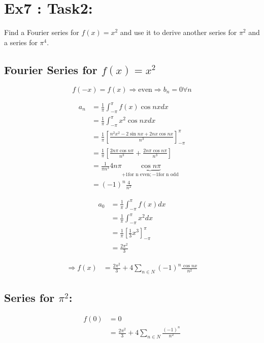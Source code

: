 \documentclass{article}
\begin{document}
\section{Ex7 : Task2:}
Find a Fourier series for $f (x) = x^2$ and use it to derive another series for $\pi^2$ and a series
for $\pi^4$.

\subsection{Fourier Series for $f(x) = x^2$}

\[
f(-x) = f(x) \Rightarrow \text{even} \Rightarrow b_n=0\forall n
\]

\begin{align}
a_n &= \frac{1}{\pi} \int_{-\pi}^\pi {f(x) \cos{nx} dx} \\
  &= \frac{1}{\pi} \int_{-\pi}^\pi {x^2 \cos{nx} dx} \\
	&= \frac{1}{\pi} \left[ \frac{n^2x^2-2\sin{nx} + 2nx\cos{nx}}{n^3} \right]_{-\pi}^\pi \\
	&= \frac{1}{\pi} \left[ \frac{2n\pi\cos{n\pi}}{n^3} + \frac{2n\pi\cos{n\pi}}{n^3} \right] \\
	&= \frac{1}{\pi n^3}4n\pi\underbrace{\cos{n\pi}}_{+1 \text{for n even}; -1 \text{for n odd}}\\
	&= (-1)^n \frac{4}{n^2}
\end{align}

\begin{align}
a_0 &= \frac{1}{\pi} \int_{-\pi}^\pi {f(x) dx} \\
  &= \frac{1}{\pi} \int_{-\pi}^\pi {x^2 dx} \\
	&= \frac{1}{\pi} \left[ \frac{1}{3}x^3 \right]_{-\pi}^\pi \\
	&= \frac{2\pi^2}{3}
\end{align}

\begin{align}
\Rightarrow f(x) &= \frac{2\pi^2}{3} + 4 \sum_{n\in N}{(-1)}^n \frac{\cos{nx}}{n^2}
\end{align}

\subsection{Series for $\pi^2$:}

\begin{align}
f(0) &= 0 \\
     &= \frac{2\pi^2}{3} + 4 \sum_{n\in N}{\frac{(-1)^n}{n^2}}
\end{align}
\end{document}
